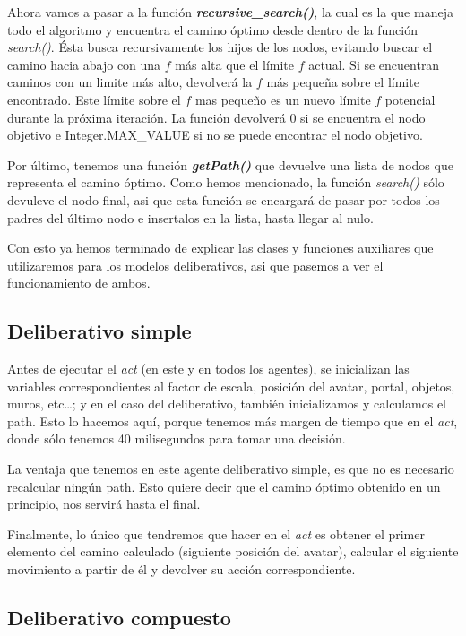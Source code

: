 \documentclass[11pt,a4paper]{article}
\begin{document}
Ahora vamos a pasar a la función \textbf{\textit{recursive\_search()}}, la cual es la que maneja todo
el algoritmo y encuentra el camino óptimo desde dentro de la función \textit{search()}. Ésta busca recursivamente
los hijos de los nodos, evitando buscar el camino hacia abajo con una $f$ más alta que el límite $f$ actual.
Si se encuentran caminos con un limite más alto, devolverá la $f$ más pequeña sobre el límite encontrado.
Este límite sobre el $f$ mas pequeño es un nuevo límite $f$ potencial durante la próxima iteración. La función
devolverá 0 si se encuentra el nodo objetivo e Integer.MAX\_VALUE si no se puede encontrar el nodo objetivo.

Por último, tenemos una función \textit{\textbf{getPath()}} que devuelve una lista de nodos que representa el
camino óptimo. Como hemos mencionado, la función \textit{search()} sólo devuleve el nodo final, asi que esta
función se encargará de pasar por todos los padres del último nodo e insertalos en la lista, hasta llegar al
nulo.

Con esto ya hemos terminado de explicar las clases y funciones auxiliares que utilizaremos para los modelos
deliberativos, asi que pasemos a ver el funcionamiento de ambos.


\subsection{Deliberativo simple}

Antes de ejecutar el \textit{act} (en este y en todos los agentes), se inicializan las variables correspondientes
al factor de escala, posición del avatar, portal, objetos, muros, etc\dots; y en el caso del deliberativo, también
inicializamos y calculamos el path. Esto lo hacemos aquí, porque tenemos más margen de tiempo que en el \textit{act},
donde sólo tenemos 40 milisegundos para tomar una decisión.

La ventaja que tenemos en este agente deliberativo simple, es que no es necesario recalcular ningún path. Esto
quiere decir que el camino óptimo obtenido en un principio, nos servirá hasta el final.

Finalmente, lo único que tendremos que hacer en el \textit{act} es obtener el primer elemento del camino calculado
(siguiente posición del avatar), calcular el siguiente movimiento a partir de él y devolver su acción
correspondiente.


\subsection{Deliberativo compuesto}
\end{document}
